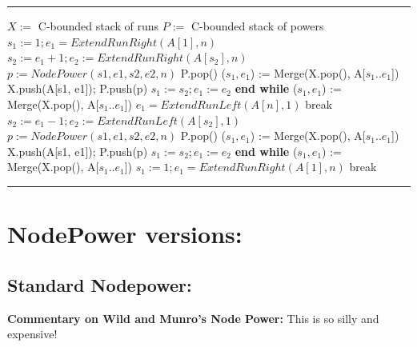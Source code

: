 \documentclass{article}
\begin{document}
\vspace{-0.6em} %
\noindent\rule{\linewidth}{0.5pt}\par %
\vspace{-0.5em} %
\begin{algorithmic}[1]
\State $X :=$ C-bounded stack of runs
\State $P :=$ C-bounded stack of powers
    \State $s_1 := 1; e_1 = ExtendRunRight(A[1], n)$
        \State $s_2 := e_1 + 1; e_2 := ExtendRunRight(A[s_2], n)$ 
        \State $p := NodePower(s1, e1, s2, e2, n)$
            \State P.pop()
            \State ($s_1, e_1$) := Merge(X.pop(), A[$s_1..e_1$])
        \EndWhile \State X.push(A[s1, e1]); P.push(p)
        \State $s_1 := s_2; e_1 := e_2$
    \EndWhile
    \State \textbf{end while} 
        \State ($s_1, e_1$) := Merge(X.pop(), A[$s_1..e_1$]) 
    \EndWhile
    \State $e_1 = ExtendRunLeft(A[n], 1)$ 
        \State break 
    \EndIf
     
        \State $s_2 := e_1 - 1; e_2 := ExtendRunLeft(A[s_2], 1)$ 
        \State $p := NodePower(s1, e1, s2, e2, n)$
            \State P.pop()
            \State ($s_1, e_1$) := Merge(X.pop(), A[$s_1..e_1$])
        \EndWhile \State X.push(A[s1, e1]); P.push(p)
        \State $s_1 := s_2; e_1 := e_2$
    \EndWhile 
    \State \textbf{end while}
        \State ($s_1, e_1$) := Merge(X.pop(), A[$s_1..e_1$]) 
    \EndWhile
    \State $s_1 := 1; e_1 = ExtendRunRight(A[1], n)$ 
        \State break 
    \EndIf
\EndWhile
\end{algorithmic}
\vspace{-1em}
\noindent\rule{\linewidth}{0.5pt}\par 

\section{NodePower versions:}
\subsection{Standard Nodepower:}
\textbf{Commentary on Wild and Munro's Node Power:} This is so silly and expensive! 
\end{document}
